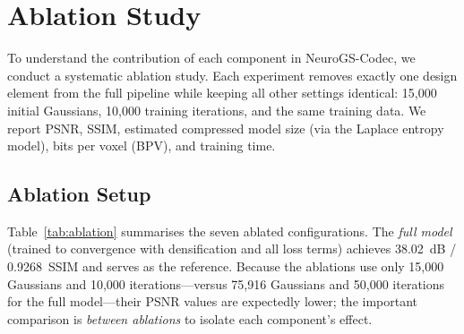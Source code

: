 \documentclass[11pt,a4paper]{article}
\begin{document}
\section{Ablation Study}
\label{sec:ablation}

To understand the contribution of each component in NeuroGS-Codec, we conduct a systematic ablation study.  Each experiment removes exactly one design element from the full pipeline while keeping all other settings identical: 15{,}000 initial Gaussians, 10{,}000 training iterations, and the same training data.  We report PSNR, SSIM, estimated compressed model size (via the Laplace entropy model), bits per voxel (BPV), and training time.

\subsection{Ablation Setup}

Table~\ref{tab:ablation} summarises the seven ablated configurations.
The \emph{full model} (trained to convergence with densification and all loss terms) achieves 38.02~dB / 0.9268~SSIM and serves as the reference.  Because the ablations use only 15{,}000 Gaussians and 10{,}000 iterations—versus 75{,}916 Gaussians and 50{,}000 iterations for the full model---their PSNR values are expectedly lower; the important comparison is \emph{between ablations} to isolate each component's effect.
\end{document}
